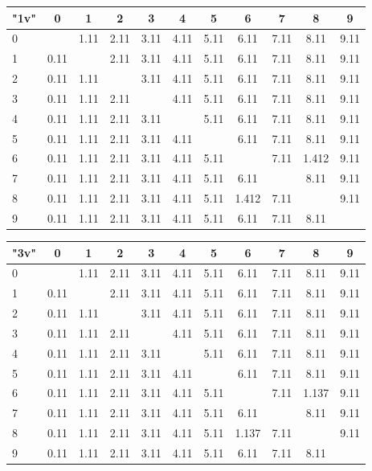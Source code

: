 \begin{table*}
	\centering
	\begin{tabular}{|l||c|c|c|c|c|c|c|c|c|c|}\hline
		{\bf "1v"} & 0 & 1 & 2 & 3 & 4 & 5 & 6 & 7 & 8 & 9 \\\hline\hline
		0 &  & 1.11 & 2.11 & 3.11 & 4.11 & 5.11 & 6.11 & 7.11 & 8.11 & 9.11 \\\hline
		1 & 0.11 &  & 2.11 & 3.11 & 4.11 & 5.11 & 6.11 & 7.11 & 8.11 & 9.11 \\\hline
		2 & 0.11 & 1.11 & & 3.11 & 4.11 & 5.11 & 6.11 & 7.11 & 8.11 & 9.11 \\\hline
		3 & 0.11 & 1.11 & 2.11 & & 4.11 & 5.11 & 6.11 & 7.11 & 8.11 & 9.11 \\\hline
		4 & 0.11 & 1.11 & 2.11 & 3.11 & & 5.11 & 6.11 & 7.11 & 8.11 & 9.11 \\\hline
		5 & 0.11 & 1.11 & 2.11 & 3.11 & 4.11 & & 6.11 & 7.11 & 8.11 & 9.11 \\\hline
		6 & 0.11 & 1.11 & 2.11 & 3.11 & 4.11 & 5.11 & & 7.11 & 1.412 & 9.11 \\\hline
		7 & 0.11 & 1.11 & 2.11 & 3.11 & 4.11 & 5.11 & 6.11 & & 8.11 & 9.11 \\\hline
		8 & 0.11 & 1.11 & 2.11 & 3.11 & 4.11 & 5.11 & 1.412 & 7.11 &  & 9.11 \\\hline
		9 & 0.11 & 1.11 & 2.11 & 3.11 & 4.11 & 5.11 & 6.11 & 7.11 & 8.11 &  \\\hline
	\end{tabular}

	\vspace{0.3cm}
	
	\begin{tabular}{|l||c|c|c|c|c|c|c|c|c|c|}\hline
		{\bf "3v"} & 0 & 1 & 2 & 3 & 4 & 5 & 6 & 7 & 8 & 9 \\\hline\hline
		0 &  & 1.11 & 2.11 & 3.11 & 4.11 & 5.11 & 6.11 & 7.11 & 8.11 & 9.11 \\\hline
		1 & 0.11 &  & 2.11 & 3.11 & 4.11 & 5.11 & 6.11 & 7.11 & 8.11 & 9.11 \\\hline
		2 & 0.11 & 1.11 & & 3.11 & 4.11 & 5.11 & 6.11 & 7.11 & 8.11 & 9.11 \\\hline
		3 & 0.11 & 1.11 & 2.11 & & 4.11 & 5.11 & 6.11 & 7.11 & 8.11 & 9.11 \\\hline
		4 & 0.11 & 1.11 & 2.11 & 3.11 & & 5.11 & 6.11 & 7.11 & 8.11 & 9.11 \\\hline
		5 & 0.11 & 1.11 & 2.11 & 3.11 & 4.11 & & 6.11 & 7.11 & 8.11 & 9.11 \\\hline
		6 & 0.11 & 1.11 & 2.11 & 3.11 & 4.11 & 5.11 & & 7.11 & 1.137 & 9.11 \\\hline
		7 & 0.11 & 1.11 & 2.11 & 3.11 & 4.11 & 5.11 & 6.11 & & 8.11 & 9.11 \\\hline
		8 & 0.11 & 1.11 & 2.11 & 3.11 & 4.11 & 5.11 & 1.137 & 7.11 &  & 9.11 \\\hline
		9 & 0.11 & 1.11 & 2.11 & 3.11 & 4.11 & 5.11 & 6.11 & 7.11 & 8.11 &  \\\hline
	\end{tabular}
	

\end{table*}
